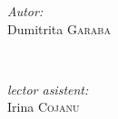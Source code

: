 \begin{center}
	
	
	
	\vspace{30mm}
	
	
	
	\begin{minipage}{0.4\textwidth}
		
		\begin{flushleft} \large
			
			\emph{Autor:}\\
			
			Dumitrita \textsc{Garaba}
			
		\end{flushleft}
		
	\end{minipage}
	
	~
	
	\begin{minipage}{0.4\textwidth}
		
		\begin{flushright} \large
			
			\emph{lector asistent:} \\
			
			Irina \textsc{Cojanu} \\ %
			
			
			
			
			
		\end{flushright}
		
	\end{minipage}\\[4cm]
	
	
	
	\vspace{5 mm}
	
	
	
	
	
	
	

\end{center}

